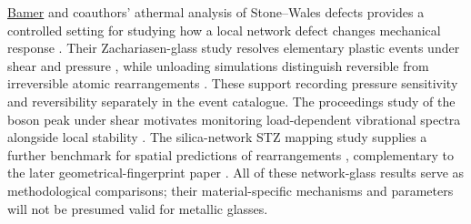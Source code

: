 \documentclass[11pt,a4paper]{article}
\begin{document}
\underline{Bamer} and coauthors' athermal analysis of Stone--Wales defects provides a controlled setting for studying how a local network defect changes mechanical response \cite{bamerstone2019}. Their Zachariasen-glass study resolves elementary plastic events under shear and pressure \cite{bamerevents2020}, while unloading simulations distinguish reversible from irreversible atomic rearrangements \cite{bamerreverse2020}. These support recording pressure sensitivity and reversibility separately in the event catalogue. The proceedings study of the boson peak under shear motivates monitoring load-dependent vibrational spectra alongside local stability \cite{bamerboson2023}. The silica-network STZ mapping study supplies a further benchmark for spatial predictions of rearrangements \cite{bamermapping2025}, complementary to the later geometrical-fingerprint paper \cite{bamer2026}. All of these network-glass results serve as methodological comparisons; their material-specific mechanisms and parameters will not be presumed valid for metallic glasses.
\end{document}
